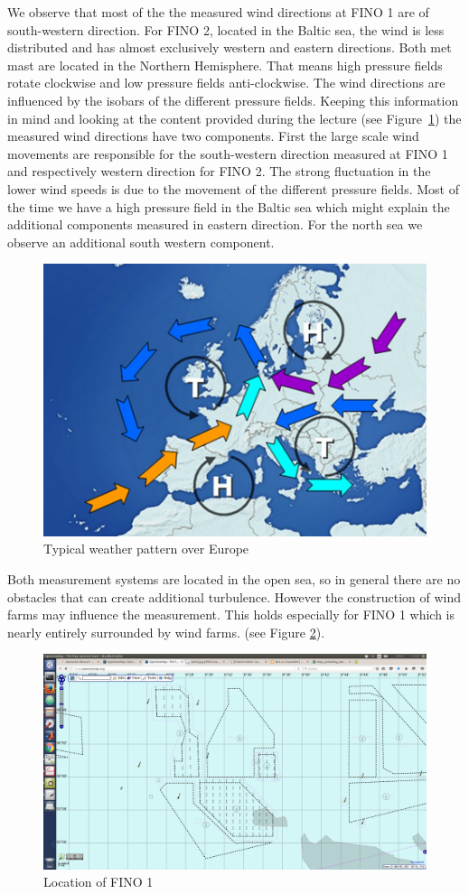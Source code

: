 \documentclass[10pt]{article}
\begin{document}
We observe that most of the the measured wind directions at FINO 1 are of south-western direction. For FINO 2, located in the Baltic sea, the wind is less distributed and has almost exclusively western and eastern directions. Both met mast are located in the Northern Hemisphere. That means high pressure fields rotate clockwise and low pressure fields anti-clockwise. The wind directions are influenced by the isobars of the different pressure fields. Keeping this information in mind and looking at the content provided during the lecture (see Figure~\ref{fig:weatherpattern}) the measured wind directions have two components. First the large scale wind movements are responsible for the south-western direction measured at FINO 1 and respectively western direction for FINO 2. The strong fluctuation in the lower wind speeds is due to the movement of the different pressure fields. Most of the time we have a high pressure field in the Baltic sea which might explain the additional components measured in eastern direction. For the north sea we observe an additional south western component.\\

\begin{figure}[H]
\centering
\includegraphics[width=0.5\linewidth]{../figures/warm_air_advection.png}
\caption{Typical weather pattern over Europe}
\label{fig:weatherpattern}
\end{figure}

Both measurement systems are located in the open sea, so in general there are no obstacles that can create additional turbulence. However the construction of wind farms may influence the measurement. This holds especially for FINO 1 which is nearly entirely surrounded by wind farms. (see Figure \ref{fig:fino1}).\\

\begin{figure}[H]
\centering
\includegraphics[width=0.5\linewidth]{../figures/fino1.png}
\caption{Location of FINO 1}
\label{fig:fino1}
\end{figure} 
 
\end{document}
